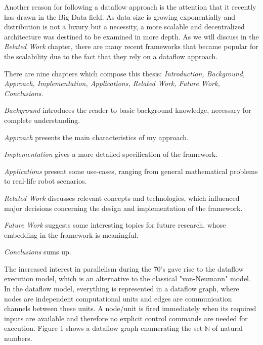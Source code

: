 \documentclass{dithesis}
\begin{document}

Another reason for following a dataflow approach is the attention that it recently has drawn in the Big Data field. As data size is growing exponentially and distribution is not a luxury but a necessity, a more scalable and decentralized architecture was destined to be examined in more depth. As we will discuss in the \textit{Related Work} chapter, there are many recent frameworks that became popular for the scalability due to the fact that they rely on a dataflow approach.


There are nine chapters which compose this thesis: \textit{Introduction, Background, Approach, Implementation, Applications, Related Work, Future Work, Conclusions}.

\textit{Background} introduces the reader to basic background knowledge, necessary for complete understanding.

\textit{Approach} presents the main characteristics of my approach.

\textit{Implementation} gives a more detailed specification of the framework.

\textit{Applications} present some use-cases, ranging from general mathematical problems to real-life robot scenarios.

\textit{Related Work} discusses relevant concepts and technologies, which influenced major decisions concerning the design and implementation of the framework.

\textit{Future Work} suggests some interesting topics for future research, whose embedding in the framework is meaningful.

\textit{Conclusions} sums up.


The increased interest in parallelism during the 70's gave rise to the dataflow execution model, which is an alternative to the classical "von-Neumann" model. In the dataflow model, everything is represented in a dataflow graph, where nodes are independent computational units  and edges are communication channels between these units. A node/unit is fired immediately when its required inputs are available and therefore no explicit control commands are needed for execution. Figure 1 shows a dataflow graph enumerating the set $\mathbb{N}$ of natural numbers.

\end{document}
